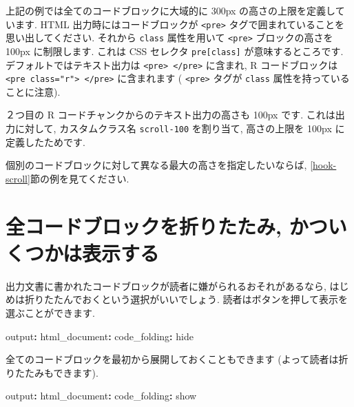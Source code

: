 \documentclass[
  11pt,
  lualatex,ja=standard,jafont=noto]{bxjsreport}
\newenvironment{Shaded}{\begin{snugshade}}{\end{snugshade}}
\newcommand{\AttributeTok}[1]{\textcolor[rgb]{0.77,0.63,0.00}{#1}}
\newcommand{\FunctionTok}[1]{\textcolor[rgb]{0.00,0.00,0.00}{#1}}
\newcommand{\KeywordTok}[1]{\textcolor[rgb]{0.13,0.29,0.53}{\textbf{#1}}}
\begin{document}
上記の例では全てのコードブロックに大域的に 300px の高さの上限を定義しています. HTML 出力時にはコードブロックが \texttt{\textless{}pre\textgreater{}} タグで囲まれていることを思い出してください. それから \texttt{class} 属性を用いて \texttt{\textless{}pre\textgreater{}} ブロックの高さを 100px に制限します. これは CSS セレクタ \texttt{pre{[}class{]}} が意味するところです. デフォルトではテキスト出力は \texttt{\textless{}pre\textgreater{}\ \textless{}/pre\textgreater{}} に含まれ, R コードブロックは \texttt{\textless{}pre\ class="r"\textgreater{}\ \textless{}/pre\textgreater{}} に含まれます ( \texttt{\textless{}pre\textgreater{}} タグが \texttt{class} 属性を持っていることに注意).

２つ目の R コードチャンクからのテキスト出力の高さも 100px です. これは出力に対して, カスタムクラス名 \texttt{scroll-100} を割り当て, 高さの上限を 100px に定義したためです.

個別のコードブロックに対して異なる最大の高さを指定したいならば, \ref{hook-scroll}節の例を見てください.

\hypertarget{fold-show}{%
\section{全コードブロックを折りたたみ, かついくつかは表示する}\label{fold-show}}

出力文書に書かれたコードブロックが読者に嫌がられるおそれがあるなら, はじめは折りたたんでおくという選択がいいでしょう. 読者はボタンを押して表示を選ぶことができます.

\begin{Shaded}
\begin{Highlighting}[]
\FunctionTok{output}\KeywordTok{:}
\AttributeTok{  }\FunctionTok{html\_document}\KeywordTok{:}
\AttributeTok{    }\FunctionTok{code\_folding}\KeywordTok{:}\AttributeTok{ hide}
\end{Highlighting}
\end{Shaded}

全てのコードブロックを最初から展開しておくこともできます (よって読者は折りたたみもできます).

\begin{Shaded}
\begin{Highlighting}[]
\FunctionTok{output}\KeywordTok{:}
\AttributeTok{  }\FunctionTok{html\_document}\KeywordTok{:}
\AttributeTok{    }\FunctionTok{code\_folding}\KeywordTok{:}\AttributeTok{ show}
\end{Highlighting}
\end{Shaded}
\end{document}
